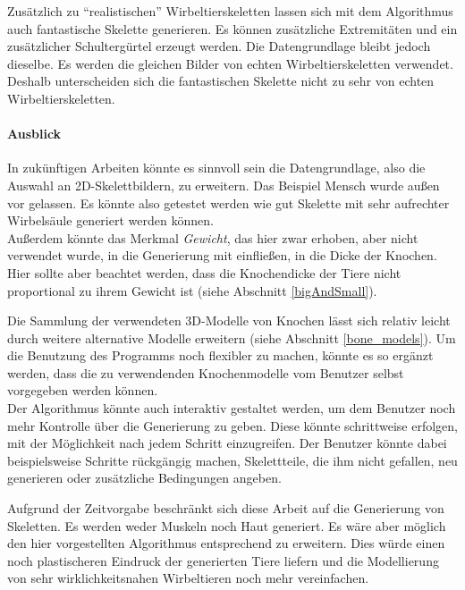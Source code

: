 Zusätzlich zu "`realistischen"' Wirbeltierskeletten lassen sich mit dem Algorithmus auch fantastische Skelette generieren. Es können zusätzliche Extremitäten und ein zusätzlicher Schultergürtel erzeugt werden.
Die Datengrundlage bleibt jedoch dieselbe. Es werden die gleichen Bilder von echten Wirbeltierskeletten verwendet.
Deshalb unterscheiden sich die fantastischen Skelette nicht zu sehr von echten Wirbeltierskeletten.  


\paragraph{Ausblick}

In zukünftigen Arbeiten könnte es sinnvoll sein die Datengrundlage, also die Auswahl an 2D-Skelettbildern, zu erweitern. Das Beispiel Mensch wurde \zb außen vor gelassen. Es könnte also getestet werden wie gut Skelette mit sehr aufrechter Wirbelsäule generiert werden können.\\
Außerdem könnte das Merkmal \emph{Gewicht}, das hier zwar erhoben, aber nicht verwendet wurde, in die Generierung mit einfließen, \zb in die Dicke der Knochen. Hier sollte aber beachtet werden, dass die Knochendicke der Tiere nicht proportional zu ihrem Gewicht ist (siehe Abschnitt \ref{bigAndSmall}).

Die Sammlung der verwendeten 3D-Modelle von Knochen lässt sich relativ leicht durch weitere \bzw alternative Modelle erweitern (siehe Abschnitt \ref{bone_models}). Um die Benutzung des Programms noch flexibler zu machen, könnte es so ergänzt werden, dass die zu verwendenden Knochenmodelle vom Benutzer selbst vorgegeben werden können.\\
Der Algorithmus könnte auch interaktiv gestaltet werden, um dem Benutzer noch mehr Kontrolle über die Generierung zu geben. Diese könnte \zb schrittweise erfolgen, mit der Möglichkeit nach jedem Schritt einzugreifen. Der Benutzer könnte dabei beispielsweise Schritte rückgängig machen, Skelettteile, die ihm nicht gefallen, neu generieren oder zusätzliche Bedingungen angeben.

Aufgrund der Zeitvorgabe beschränkt sich diese Arbeit auf die Generierung von Skeletten. Es werden weder Muskeln noch Haut generiert. Es wäre aber möglich den hier vorgestellten Algorithmus entsprechend zu erweitern. Dies würde einen noch plastischeren Eindruck der generierten Tiere liefern und die Modellierung von sehr wirklichkeitsnahen Wirbeltieren noch mehr vereinfachen.


